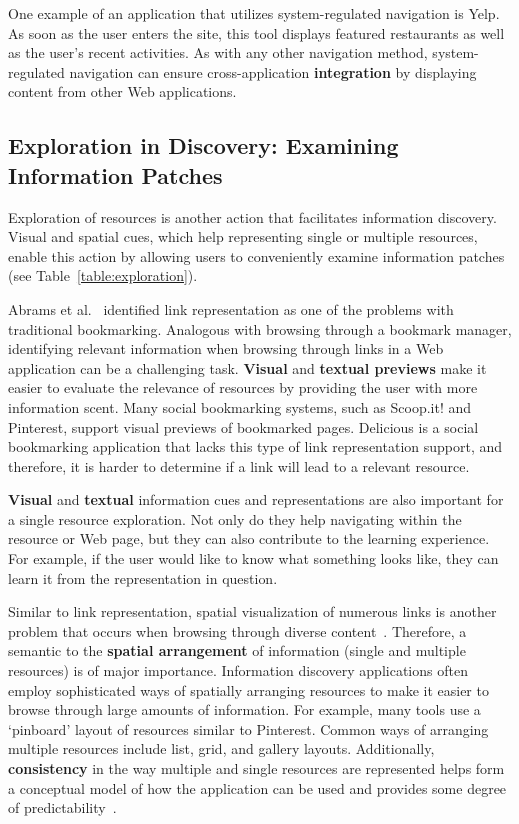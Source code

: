\documentclass{sigchi}
\begin{document}
{{{One example of an application that utilizes system-regulated navigation is Yelp. As soon as the user enters the site, this tool displays featured restaurants as well as the user's recent activities. As with any other navigation method, system-regulated navigation can ensure cross-application \textbf{integration} by displaying content from other Web applications. 
} %
} %

{\subsection{Exploration in Discovery: Examining Information Patches}
Exploration of resources is another action that facilitates information discovery. Visual and spatial cues, which help representing single or multiple resources, enable this action by allowing users to conveniently examine information patches (see Table~\ref{table:exploration}). 


Abrams et al.~\cite{abrams1998information} identified link representation as one of the problems with traditional bookmarking. Analogous with browsing through a bookmark manager, identifying relevant information when browsing through links in a Web application can be a challenging task. \textbf{Visual} and \textbf{textual previews} make it easier to evaluate the relevance of resources by providing the user with more information scent. Many social bookmarking systems, such as Scoop.it! and Pinterest, support visual previews of bookmarked pages. Delicious is a social bookmarking application that lacks this type of link representation support, and therefore, it is harder to determine if a link will lead to a relevant resource.

\textbf{Visual} and \textbf{textual} information cues and representations are also important for a single resource exploration. Not only do they help navigating within the resource or Web page, but they can also contribute to the learning experience. For example, if the user would like to know what something looks like, they can learn it from the representation in question.  

Similar to link representation, spatial visualization of numerous links is another problem that occurs when browsing through diverse content~\cite{abrams1998information}. Therefore, a semantic to the \textbf{spatial arrangement} of information (single and multiple resources) is of major importance. Information discovery applications often employ sophisticated ways of spatially arranging resources to make it easier to browse through large amounts of information. For example, many tools use a `pinboard' layout of resources similar to Pinterest. Common ways of arranging multiple resources include list, grid, and gallery layouts. Additionally, \textbf{consistency} in the way multiple and single resources are represented helps form a conceptual model of how the application can be used and provides some degree of predictability~\cite{norman2002design}.

}}
\end{document}

